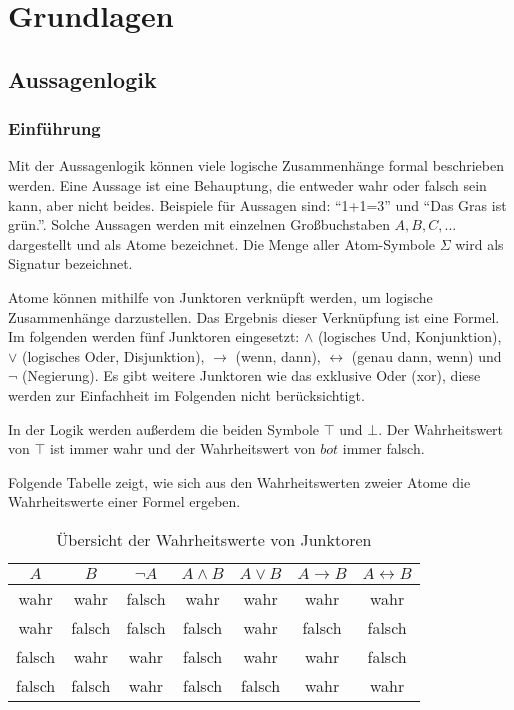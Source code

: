
\chapter{Grundlagen}
	\section{Aussagenlogik}
		\subsection{Einführung}
Mit der Aussagenlogik können viele logische Zusammenhänge formal beschrieben werden. Eine Aussage ist eine Behauptung, die entweder wahr oder falsch sein kann, aber nicht beides. Beispiele für Aussagen sind: "`1+1=3"' und "`Das Gras ist grün."'. Solche Aussagen werden mit einzelnen Großbuchstaben $A, B, C, ...$ dargestellt und als Atome bezeichnet. Die Menge aller Atom-Symbole $\Sigma$ wird als Signatur bezeichnet. 

Atome können mithilfe von Junktoren verknüpft werden, um logische Zusammenhänge darzustellen. Das Ergebnis dieser Verknüpfung ist eine Formel. 
Im folgenden werden fünf Junktoren eingesetzt: $\wedge$ (logisches Und, Konjunktion), $\vee$ (logisches Oder, Disjunktion), $\to$ (wenn, dann), $\leftrightarrow$ (genau dann, wenn) und $\neg$ (Negierung). Es gibt weitere Junktoren wie das exklusive Oder (xor), diese werden zur Einfachheit im Folgenden nicht berücksichtigt.

In der Logik werden außerdem die beiden Symbole $\top$ und $\bot$. Der Wahrheitswert von $\top$ ist immer wahr und der Wahrheitswert von $bot$ immer falsch.

Folgende Tabelle zeigt, wie sich aus den Wahrheitswerten zweier Atome die Wahrheitswerte einer Formel ergeben.

\begin{table}[h]
	\centering
	\begin{tabular}{| c | c || c | c | c | c | c |}
		\hline
		$A$ & $B$ & $\neg A$ & $A \wedge B$ & $A \vee B$ & $A \to B$ & $A \leftrightarrow B$ \\
		\hline
		wahr & wahr & falsch & wahr & wahr & wahr & wahr \\
		wahr & falsch & falsch & falsch & wahr & falsch & falsch \\
		falsch & wahr & wahr & falsch & wahr & wahr & falsch \\
		falsch & falsch & wahr & falsch & falsch & wahr & wahr \\
		\hline
	\end{tabular}
	\caption{Übersicht der Wahrheitswerte von Junktoren}
	\label{table:Junktoren}
\end{table}

